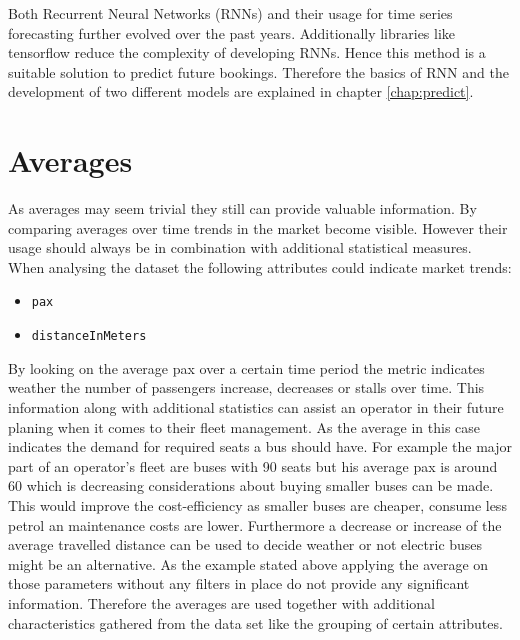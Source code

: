 Both Recurrent Neural Networks (RNNs) and their usage for time series forecasting further evolved over the past years. Additionally libraries like tensorflow  reduce the complexity of developing RNNs. Hence this method is a suitable solution to predict future bookings. Therefore the basics of RNN and the development of two different models are explained in chapter \ref{chap:predict}.

\section{Averages}
\label{sec:averages}
As averages may seem trivial they still can provide valuable information. By comparing averages over time trends in the market become visible. However their usage should always be in combination with additional statistical measures. When analysing the dataset the following attributes could indicate market trends: 
\begin{itemize}
\item \verb|pax|
\item \verb|distanceInMeters|
\end{itemize}
By looking on the average pax over a certain time period the metric indicates weather the number of passengers increase, decreases or stalls over time. This information along with additional statistics can assist an operator in their future planing when it comes to their fleet management. As the average in this case indicates the demand for required seats a bus should have. For example the major part of an operator's fleet are buses with 90 seats but his average pax is around 60 which is decreasing considerations about buying smaller buses can be made. This would improve the cost-efficiency as smaller buses are cheaper, consume less petrol an maintenance costs are lower. Furthermore a decrease or increase of the average travelled distance can be used to decide weather or not electric buses might be an alternative.
As the example stated above applying the average on those parameters without any filters in place do not provide any significant information. Therefore the averages are used together with additional characteristics gathered from the data set like the grouping of certain attributes. 

